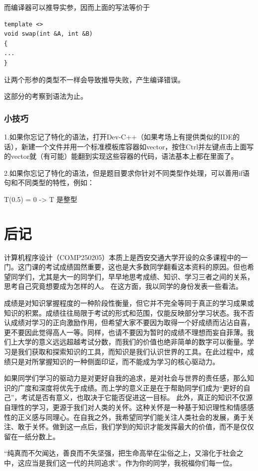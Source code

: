 \documentclass[UTF8]{ctexart}
\begin{document}
而编译器可以推导实参，因而上面的写法等价于
\begin{lstlisting}
template <>
void swap(int &A, int &B)
{
...
}
\end{lstlisting}

让两个形参的类型不一样会导致推导失败，产生编译错误。

这部分的考察到语法为止。

\subsubsection{小技巧}
1.如果你忘记了特化的语法，打开Dev-C++（如果考场上有提供类似的IDE的话），新建一个文件并用一个标准模板库容器如vector，按住Ctrl并左键点击上面写的vector就（有可能）能翻到实现这些容器的代码，语法基本上都在里面了。

2.如果你忘记了特化的语法，但是题目要求你针对不同类型作处理，可以善用if语句和不同类型的特性，例如：

T(0.5) = 0 -> T 是整型
\newpage
\section{后记}
计算机程序设计（COMP250205）本质上是西安交通大学开设的众多课程中的一门。这门课的考试成绩固然重要，这也是大多数同学翻看这本资料的原因。但也希望同学们，尤其是大一的同学们，早早地思考成绩、知识、学习三者之间的关系，思考自己究竟想要成为怎样的人。
在这方面，我以同学的身份发表一些看法。

成绩是对知识掌握程度的一种阶段性衡量，但它并不完全等同于真正的学习成果或知识的积累。成绩往往局限于考试的形式和范围，仅能反映部分学习状态。我不否认成绩对学习的正向激励作用，但希望大家不要因为取得一个好成绩而沾沾自喜，
更不要因此觉得高人一等。同样，也请不要因为暂时的成绩不理想而妄自菲薄。我们上大学的意义远远超越考试分数，而我们的价值也绝非简单的数字可以衡量。学习是我们获取和探索知识的工具，而知识是我们认识世界的工具。在此过程中，成绩只是对所掌握知识的一种侧面印证，而不能成为学习的核心驱动力。

如果同学们学习的驱动力是对更好自我的追求，是对社会与世界的责任感，那么知识的广度和深度将优先于成绩。而上学的意义正是在于帮助同学们成为“更好的自己”，考试是否有意义，也取决于它能否促进这一目标。
此外，真正的知识不仅源自理性的学习，更源于我们对人类的关怀。这种关怀是一种基于知识理性和情感感性的正义感与同理心。在自我之外，我希望同学们能关注人类社会的发展，勇于关注、敢于关怀。做到这一点后，我们学到的知识才能发挥最大的价值，而不是仅仅留在一纸分数上。

“纯真而不欠闻达，善良而不失坚强，把生命高举在尘俗之上，又溶化于社会之中，这应当是我们这一代的共同追求”。作为你的同学，我祝福你们每一位。
\end{document}
